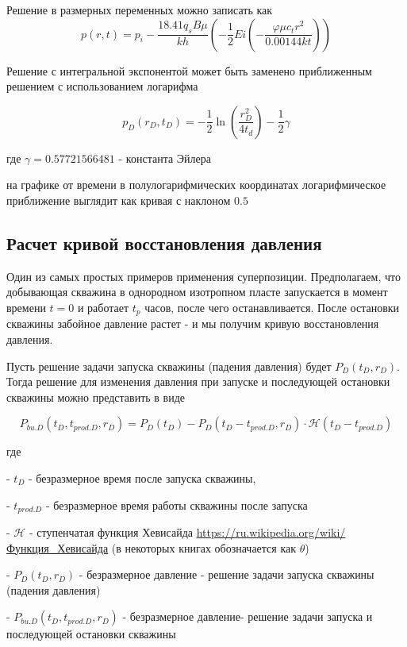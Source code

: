 \documentclass[oneside, openany]{memoir}
\begin{document}
	Решение в размерных переменных можно записать как
	\begin{equation}
	p\left(r,t\right)=p_i-\frac{18.41q_sB\mu}{kh}\left(-\frac{1}{2} Ei \left(-\frac{\varphi\mu c_tr^2}{0.00144kt}\right)\right) 
	\end{equation}
	
	
	Решение с интегральной экспонентой может быть заменено приближенным решением с использованием логарифма 
	
	$$ 
	p_D(r_D,t_D) = - \frac{1}{2} \ln \left( \dfrac{ r_D^2}{4t_d} \right) - \frac{1}{2}\gamma 
	$$
	
	где $\gamma = 0.57721566481$ - константа Эйлера
	
	на графике от времени в полулогарифмических координатах логарифмическое приближение выглядит как кривая с наклоном $0.5$
	
	\subsection{Расчет кривой восстановления давления}
	
	Один из самых простых примеров применения суперпозиции. Предполагаем, что добывающая скважина в однородном изотропном пласте запускается в момент времени $t=0$ и работает $t_{p}$ часов, после чего останавливается. После остановки скважины забойное давление растет - и мы получим кривую восстановления давления.
	
	Пусть решение задачи запуска скважины (падения давления) будет $P_D(t_D, r_D)$. Тогда решение для изменения давления при запуске и последующей остановки скважины можно представить в виде 
	
	\begin{equation}
	P_{bu.D}(t_D, t_{prod.D}, r_D) = P_D(t_D) - P_D(t_D-t_{prod.D}, r_D) \cdot \mathcal{H}(t_D-t_{prod.D}) 
	\end{equation}
	
	где
	
	- $t_D$ - безразмерное время после запуска скважины,
	
	- $t_{prod.D}$ - безразмерное время работы скважины после запуска
	
	- $\mathcal{H}$ - ступенчатая функция Хевисайда \url{https://ru.wikipedia.org/wiki/Функция_Хевисайда} (в некоторых книгах обозначается как $\theta$)
	
	- $P_D(t_D, r_D)$ - безразмерное давление - решение задачи запуска скважины (падения давления)
	
	- $P_{bu.D}(t_D, t_{prod.D}, r_D)$ - безразмерное давление- решение задачи запуска  и последующей остановки скважины
	
\end{document}
